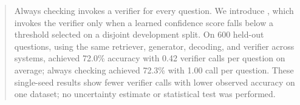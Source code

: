 \begin{abstract}
Always checking invokes a verifier for every question. We introduce \ourmethod{}, which invokes the verifier only when a learned confidence score falls below a threshold selected on a disjoint development split. On 600 held-out questions, using the same retriever, generator, decoding, and verifier across systems, \ourmethod{} achieved 72.0\% accuracy with 0.42 verifier calls per question on average; always checking achieved 72.3\% with 1.00 call per question. These single-seed results show fewer verifier calls with lower observed accuracy on one dataset; no uncertainty estimate or statistical test was performed.
\end{abstract}
